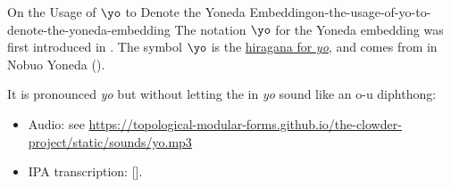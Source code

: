 \begin{remark}{On the Usage of $\yo$ to Denote the Yoneda Embedding}{on-the-usage-of-yo-to-denote-the-yoneda-embedding}%
    The notation $\yo$ for the Yoneda embedding was first introduced in \cite{oplax-natural-transformations-twisted-quantum-field-theories-and-even-higher-morita-categories}. The symbol $\yo$ is the \href{https://en.wikipedia.org/wiki/Yo_(kana%29}{hiragana for \emph{yo}}, and comes from \say{Yoneda} in Nobuo Yoneda (\Japanese{米田信夫}).

    It is pronounced \emph{yo} but without letting the  in \emph{yo} sound like an o-u diphthong:
    \begin{itemize}
            <li>Audio: <audio id="audioPlayerYo" src="/static/sounds/yo.mp3" type="audio/mp3"></audio><span class="dark-svg"><button id="playButtonYo"></button></span>
        \item Audio: see \url{https://topological-modular-forms.github.io/the-clowder-project/static/sounds/yo.mp3}
        \item IPA transcription: [].
    \end{itemize}
\end{remark}
